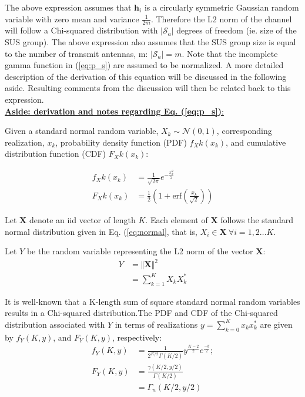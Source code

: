 The above expression assumes that $\textbf{h}_i$ is a circularly symmetric Gaussian random variable with zero mean and variance  $\frac{1}{2m}$. Therefore the L2 norm of the channel will follow a Chi-squared distribution with $\vert \mathcal{S}_a\vert$ degrees of freedom (ie. size of the SUS group). The above expression also assumes that the SUS group size is equal to the number of transmit antennas, m: $\vert \mathcal{S}_a\vert = m$. Note that the incomplete gamma function in (\ref{eq:p_s}) are assumed to be normalized. A more detailed description of the derivation of this equation will be discussed in the following aside. Resulting comments from the discussion will then be related back to this expression.\\
\underline{\textbf{Aside: derivation and notes regarding Eq. (\ref{eq:p_s})}:}

 Given a standard normal random variable, $X_k\sim\mathcal{N}(0,1)$, corresponding realization, $x_k$, probability density function (PDF) $f_Xk(x_k)$, and cumulative distribution function (CDF) $F_Xk(x_k)$:

\begin{equation}\label{eq:normal}
    \begin{aligned}
        f_Xk(x_k) &= \frac{1}{\sqrt{2\pi}}e^{-\frac{x_k^2}{2}}\\
        F_Xk(x_k) &=\frac{1}{2}(1+\text{erf}(\frac{x_k}{\sqrt{2}}))
    \end{aligned}
\end{equation}

Let $\textbf{X}$ denote an iid vector of length $K$. Each element of $\textbf{X}$ follows the standard normal distribution given in Eq. (\ref{eq:normal}, that is, $X_i\in\textbf{X}\ \forall i = 1,2\ldots K$.

Let $Y$ be the random variable representing the L2 norm of the vector $\textbf{X}$:
\begin{equation}\label{eq:ch_sq_sum}
    \begin{aligned}
        Y &= \Vert \textbf{X} \Vert^2\\
          &= \sum_{k = 1}^K X_kX_k^*
    \end{aligned}
\end{equation}

It is well-known that a K-length sum of square standard normal random variables results in a Chi-squared distribution.The PDF and CDF of the Chi-squared distribution associated with $Y$ in terms of realizations $y = \sum_{k=0}^K x_k x_k^*$ are given by $f_Y(K,y)$, and $F_Y(K,y)$, respectively:
\begin{equation}\label{eq:ch_sq}
    \begin{aligned}
        f_Y(K,y) &= \frac{1}{2^{K/2}\Gamma(K/2)}y^{\frac{K-2}{2}}e^{\frac{-y}{2}};\\
        F_Y(K,y) &= \frac{\gamma(K/2,y/2)}{\Gamma(K/2)}\\
        &= \Gamma_n(K/2,y/2)
    \end{aligned}
\end{equation}

